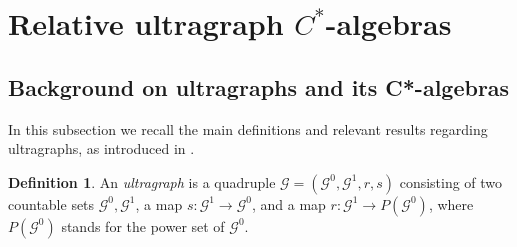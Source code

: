 \documentclass[12pt, reqno]{amsart}
\theoremstyle{definition}
\newtheorem{definition}[theorem]{Definition}
\theoremstyle{remark}
\numberwithin{equation}{section}
\newcommand{\G}{\mathcal{G}}
\begin{document}



\section{Relative ultragraph $C^\ast$-algebras}
\label{secgraphalgs}

\subsection{Background on ultragraphs and its C*-algebras}

In this subsection we recall the main definitions and relevant results regarding ultragraphs, as introduced in \cite{Tom2}.%

\begin{definition}\label{def of ultragraph}
An \emph{ultragraph} is a quadruple $\mathcal{G}=(\G^0, \mathcal{G}^1, r,s)$ consisting of two countable sets $\G^0, \mathcal{G}^1$, a map $s:\mathcal{G}^1 \to \G^0$, and a map $r:\mathcal{G}^1 \to P(\G^0)$, where $P(\G^0)$ stands for the power set of $\G^0$.
\end{definition}
\end{document}
